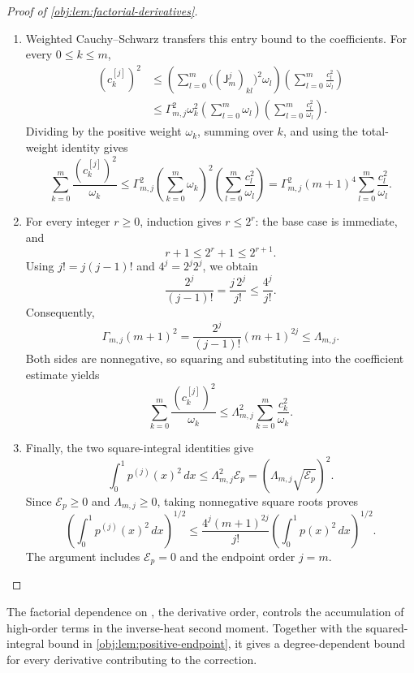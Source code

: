 \documentclass[11pt]{article}
\begin{document}
\begin{proof}[Proof of \cref{obj:lem:factorial-derivatives}]
\begin{enumerate}
\item Weighted Cauchy--Schwarz transfers this entry bound to the coefficients. For every \(0\le k\le m\),
\[
\begin{aligned}
(c_k^{[j]})^2
&\le
\left(\sum_{l=0}^m
\bigl((\mathsf J_m^j)_{kl}\bigr)^2\omega_l\right)
\left(\sum_{l=0}^m\frac{c_l^2}{\omega_l}\right)\\
&\le
\Gamma_{m,j}^2\omega_k^2
\left(\sum_{l=0}^m\omega_l\right)
\left(\sum_{l=0}^m\frac{c_l^2}{\omega_l}\right).
\end{aligned}
\]
Dividing by the positive weight \(\omega_k\), summing over \(k\), and using the total-weight identity gives
\[
\sum_{k=0}^m\frac{(c_k^{[j]})^2}{\omega_k}
\le
\Gamma_{m,j}^2
\left(\sum_{k=0}^m\omega_k\right)^2
\left(\sum_{l=0}^m\frac{c_l^2}{\omega_l}\right)
=
\Gamma_{m,j}^2(m+1)^4
\sum_{l=0}^m\frac{c_l^2}{\omega_l}.
\]

\item For every integer \(r\ge0\), induction gives \(r\le2^r\): the base case is immediate, and
\[
r+1\le2^r+1\le2^{r+1}.
\]
Using \(j!=j(j-1)!\) and \(4^j=2^j2^j\), we obtain
\[
\frac{2^j}{(j-1)!}
=
\frac{j\,2^j}{j!}
\le
\frac{4^j}{j!}.
\]
Consequently,
\[
\Gamma_{m,j}(m+1)^2
=
\frac{2^j}{(j-1)!}(m+1)^{2j}
\le
\Lambda_{m,j}.
\]
Both sides are nonnegative, so squaring and substituting into the coefficient estimate yields
\[
\sum_{k=0}^m\frac{(c_k^{[j]})^2}{\omega_k}
\le
\Lambda_{m,j}^2
\sum_{k=0}^m\frac{c_k^2}{\omega_k}.
\]

\item Finally, the two square-integral identities give
\[
\int_0^1 p^{(j)}(x)^2\,dx
\le
\Lambda_{m,j}^2\mathcal E_p
=
\left(\Lambda_{m,j}\sqrt{\mathcal E_p}\right)^2.
\]
Since \(\mathcal E_p\ge0\) and \(\Lambda_{m,j}\ge0\), taking nonnegative square roots proves
\[
\left(\int_0^1 p^{(j)}(x)^2\,dx\right)^{1/2}
\le
\frac{4^j(m+1)^{2j}}{j!}
\left(\int_0^1 p(x)^2\,dx\right)^{1/2}.
\]
The argument includes \(\mathcal E_p=0\) and the endpoint order \(j=m\).
\end{enumerate}
\end{proof}

The factorial dependence on , the derivative order, controls the accumulation of high-order terms in the inverse-heat second moment. Together with the squared-integral bound in \cref{obj:lem:positive-endpoint}, it gives a degree-dependent bound for every derivative contributing to the correction.
\end{document}
